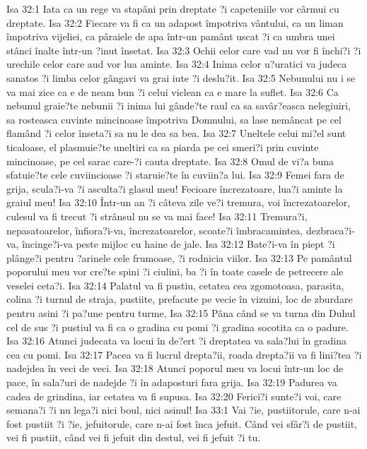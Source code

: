 Isa 32:1  Iata ca un rege va stapâni prin dreptate ?i capeteniile vor cârmui cu dreptate.
Isa 32:2  Fiecare va fi ca un adapost împotriva vântului, ca un liman împotriva vijeliei, ca pâraiele de apa într-un pamânt uscat ?i ca umbra unei stânci înalte într-un ?inut însetat.
Isa 32:3  Ochii celor care vad nu vor fi închi?i ?i urechile celor care aud vor lua aminte.
Isa 32:4  Inima celor u?uratici va judeca sanatos ?i limba celor gângavi va grai iute ?i deslu?it.
Isa 32:5  Nebunului nu i se va mai zice ca e de neam bun ?i celui viclean ca e mare la suflet.
Isa 32:6  Ca nebunul graie?te nebunii ?i inima lui gânde?te raul ca sa savâr?easca nelegiuiri, sa rosteasca cuvinte mincinoase împotriva Domnului, sa lase nemâncat pe cel flamând ?i celor înseta?i sa nu le dea sa bea.
Isa 32:7  Uneltele celui mi?el sunt ticaloase, el plasmuie?te uneltiri ca sa piarda pe cei smeri?i prin cuvinte mincinoase, pe cel sarac care-?i cauta dreptate.
Isa 32:8  Omul de vi?a buna sfatuie?te cele cuviincioase ?i staruie?te în cuviin?a lui.
Isa 32:9  Femei fara de grija, scula?i-va ?i asculta?i glasul meu! Fecioare încrezatoare, lua?i aminte la graiul meu!
Isa 32:10  Într-un an ?i câteva zile ve?i tremura, voi încrezatoarelor, culesul va fi trecut ?i strânsul nu se va mai face!
Isa 32:11  Tremura?i, nepasatoarelor, înfiora?i-va, încrezatoarelor, scoate?i îmbracamintea, dezbraca?i-va, încinge?i-va peste mijloc cu haine de jale.
Isa 32:12  Bate?i-va în piept ?i plânge?i pentru ?arinele cele frumoase, ?i rodnicia viilor.
Isa 32:13  Pe pamântul poporului meu vor cre?te spini ?i ciulini, ba ?i în toate casele de petrecere ale veselei ceta?i.
Isa 32:14  Palatul va fi pustiu, cetatea cea zgomotoasa, parasita, colina ?i turnul de straja, pustiite, prefacute pe vecie în vizuini, loc de zburdare pentru asini ?i pa?une pentru turme,
Isa 32:15  Pâna când se va turna din Duhul cel de sus ?i pustiul va fi ca o gradina cu pomi ?i gradina socotita ca o padure.
Isa 32:16  Atunci judecata va locui în de?ert ?i dreptatea va sala?lui în gradina cea cu pomi.
Isa 32:17  Pacea va fi lucrul drepta?ii, roada drepta?ii va fi lini?tea ?i nadejdea în veci de veci.
Isa 32:18  Atunci poporul meu va locui într-un loc de pace, în sala?uri de nadejde ?i în adaposturi fara grija.
Isa 32:19  Padurea va cadea de grindina, iar cetatea va fi supusa.
Isa 32:20  Ferici?i sunte?i voi, care semana?i ?i nu lega?i nici boul, nici asinul!
Isa 33:1  Vai ?ie, pustiitorule, care n-ai fost pustiit ?i ?ie, jefuitorule, care n-ai fost înca jefuit. Când vei sfâr?i de pustiit, vei fi pustiit, când vei fi jefuit din destul, vei fi jefuit ?i tu.
